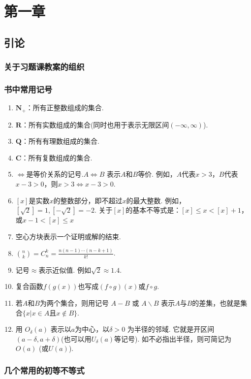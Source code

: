 \chapter{第一章}
\section{引论}
\subsection{关于习题课教案的组织}
\subsection{书中常用记号}
\begin{enumerate}
	\item $ \mathbf{N}_{+} $：所有正整数组成的集合.
	\item $ \mathbf{R} $：所有实数组成的集合(同时也用于表示无限区间$( -\infty,\infty )$).
	\item $ \mathbf{Q} $：所有有理数组成的集合.
	\item $ \mathbf{C} $：所有复数组成的集合.
	\item $ \iff $是等价关系的记号.$ A\iff B $ 表示$ A $和$ B $等价. 例如，$ A $代表$ x > 3 $，$ B $代表$ x-3>0 $，则$ x>3\iff x-3>0 $.
	\item $ [x] $是实数$ x $的整数部分，即不超过$ x $的最大整数. 例如，$ [\sqrt{2}] = 1, [-\sqrt{2}] = -2 $. 关于$ [x] $的基本不等式是：$ [x]\le x < [x] + 1 $，或$ x-1<[x]\le x $
	\item $  $空心方块表示一个证明或解的结束.
	\item $ {n \choose k} = C_n^k = \frac{n(n-1)\cdots(n-k+1)}{k!}$.
	\item 记号$ \approx $表示近似值. 例如$ \sqrt{2}\approx 1.4 $.
	\item 复合函数$ f(g(x)) $也写成$ (f\circ g)(x) $或$ f \circ g $.
	\item 若$ A $和$ B $为两个集合，则用记号 $ A-B $ 或 $ A \backslash B $ 表示$ A $与$ B $的差集，也就是集合$ \{x|x\in A \text{且} x\notin B\} $.
	\item 用 $ O_\delta (a) $ 表示以$ a $为中心，以$ \delta >0 $ 为半径的邻域. 它就是开区间$ (a-\delta, a+\delta) $(也可以用$ U_\delta (a) $等记号). 如不必指出半径，则可简记为$ O(a)$ (或$ U(a) $).
\end{enumerate}


\subsection{几个常用的初等不等式}
